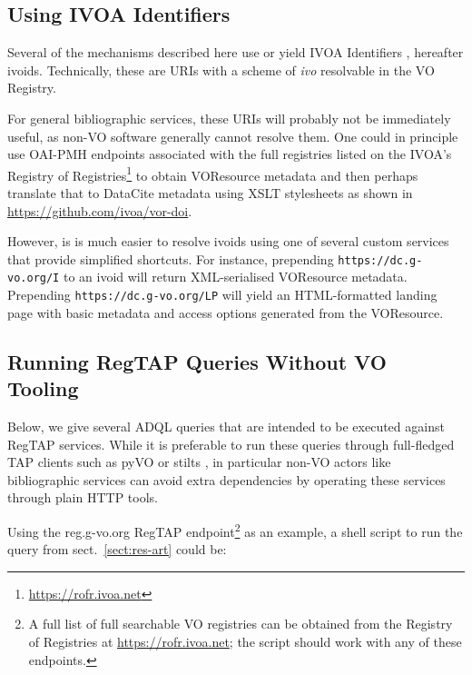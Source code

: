 \documentclass[11pt,a4paper]{ivoa}
\begin{document}
\subsection{Using IVOA Identifiers}
\label{sect:use-ivoid}

Several of the mechanisms described here use or yield IVOA Identifiers
\citep{2016ivoa.spec.0523D}, hereafter ivoids.  Technically, these are
URIs with a scheme of \textit{ivo} resolvable in the VO Registry.

For general bibliographic services, these URIs will probably not be
immediately useful, as non-VO software generally cannot resolve them.
One could in principle use OAI-PMH endpoints
associated with the full registries listed
on the IVOA's Registry of
Registries\footnote{\url{https://rofr.ivoa.net}} to obtain VOResource
metadata and then perhaps translate that to DataCite metadata using XSLT
stylesheets as shown in \url{https://github.com/ivoa/vor-doi}.

However, is is much easier to resolve ivoids using one of
several custom services that provide simplified shortcuts.
For instance, prepending \verb|https://dc.g-vo.org/I| to an ivoid will
return XML-serialised VOResource metadata.
Prepending \verb|https://dc.g-vo.org/LP|
will yield an HTML-for\-matted landing page with basic metadata and access
options generated from the VOResource.

\subsection{Running RegTAP Queries Without VO Tooling}
\label{sect:regtap}

Below, we give several ADQL queries that are intended to be executed
against RegTAP services.  While it is preferable to run these queries
through full-fledged TAP \citep{2019ivoa.spec.0927D} clients such as
pyVO \citep{2014ascl.soft02004G} or stilts \citep{2006ASPC..351..666T},
in particular non-VO actors like bibliographic services can avoid extra
dependencies by operating these services through plain HTTP tools.

Using the reg.g-vo.org RegTAP endpoint\footnote{A full list
of full searchable VO registries can be obtained from the Registry of
Registries at \url{https://rofr.ivoa.net}; the script should work with
any of these endpoints.} as an example, a shell script to run the query
from sect.~\ref{sect:res-art} could be:


\end{document}
